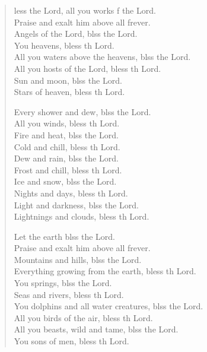 \settowidth{\versewidth}{Let us bless the Father, and the Son, and the Holy Spirit. *}
\begin{verse}%
  \begin{patverse}
    less the Lord, all you works f the Lord.\Med\\
Praise and exalt him above all frever.\\
Angels of the Lord, blss the Lord.\Med\\
You heavens, bless th Lord.\\
All you waters above the heavens, blss the Lord.\Med\\
All you hosts of the Lord, bless th Lord.\\
Sun and moon, blss the Lord.\Med\\
Stars of heaven, bless th Lord.

Every shower and dew, blss the Lord.\Med\\
All you winds, bless th Lord.\\
Fire and heat, blss the Lord.\Med\\
Cold and chill, bless th Lord.\\
Dew and rain, blss the Lord.\Med\\
Frost and chill, bless th Lord.\\
Ice and snow, blss the Lord.\Med\\
Nights and days, bless th Lord.\\
Light and darkness, blss the Lord.\Med\\
Lightnings and clouds, bless th Lord.

Let the earth blss the Lord.\Med\\
Praise and exalt him above all frever.\\
Mountains and hills, blss the Lord.\Med\\
Everything growing from the earth, bless th Lord.\\
You springs, blss the Lord.\Med\\
Seas and rivers, bless th Lord.\\
You dolphins and all water creatures, blss the Lord.\Med\\
All you birds of the air, bless th Lord.\\
All you beasts, wild and tame, blss the Lord.\Med\\
You sons of men, bless th Lord.


\end{patverse}
\end{verse}
